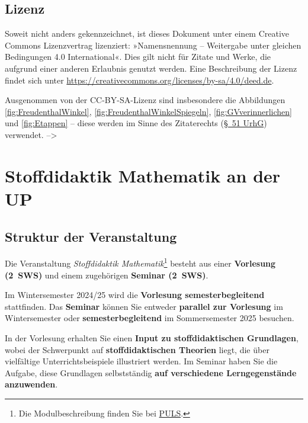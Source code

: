 \documentclass[
]{scrbook}
\theoremstyle{definition}
\theoremstyle{definition}
\theoremstyle{definition}
\theoremstyle{definition}
\theoremstyle{remark}
\begin{document}
\section*{Lizenz}\label{lizenz}

Soweit nicht anders gekennzeichnet, ist dieses Dokument unter einem Creative Commons Lizenzvertrag lizenziert: »Namensnennung -- Weitergabe unter gleichen Bedingungen 4.0 International«. Dies gilt nicht für Zitate und Werke, die aufgrund einer anderen Erlaubnis genutzt werden.
Eine Beschreibung der Lizenz findet sich unter \url{https://creativecommons.org/licenses/by-sa/4.0/deed.de}.

Ausgenommen von der CC-BY-SA-Lizenz sind insbesondere die Abbildungen \ref{fig:FreudenthalWinkel}, \ref{fig:FreudenthalWinkelSpiegeln}, \ref{fig:GVverinnerlichen} und \ref{fig:Etappen} -- diese werden im Sinne des Zitaterechts (\href{https://www.gesetze-im-internet.de/urhg/__51.html}{§~51 UrhG}) verwendet.
--\textgreater{}

\chapter*{Stoffdidaktik Mathematik an der UP}\label{stoffdidaktik-mathematik-an-der-up}

\section*{Struktur der Veranstaltung}\label{struktur-der-veranstaltung}

Die Veranstaltung \emph{Stoffdidaktik Mathematik}\footnote{Die Modulbeschreibung finden Sie bei \href{https://puls.uni-potsdam.de/qisserver/rds?state=verpublish&status=init&vmfile=no&moduleCall=modulansicht&publishConfFile=modulverwaltung&publishSubDir=up/modulbearbeiter&&modul.modul_id=3155&menuid=&topitem=Modulbeschreibung&subitem=}{PULS}.} besteht aus einer \textbf{Vorlesung (2~SWS)} und einem zugehörigen \textbf{Seminar (2~SWS)}.

Im Wintersemester 2024/25 wird die \textbf{Vorlesung semesterbegleitend} stattfinden. Das \textbf{Seminar} können Sie entweder \textbf{parallel zur Vorlesung} im Wintersemester oder \textbf{semesterbegleitend} im Sommersemester 2025 besuchen.

In der Vorlesung erhalten Sie einen \textbf{Input zu stoffdidaktischen Grundlagen}, wobei der Schwerpunkt auf \textbf{stoffdidaktischen Theorien} liegt, die über vielfältige Unterrichtsbeispiele illustriert werden. Im Seminar haben Sie die Aufgabe, diese Grundlagen selbstständig \textbf{auf verschiedene Lerngegenstände anzuwenden}.
\end{document}
